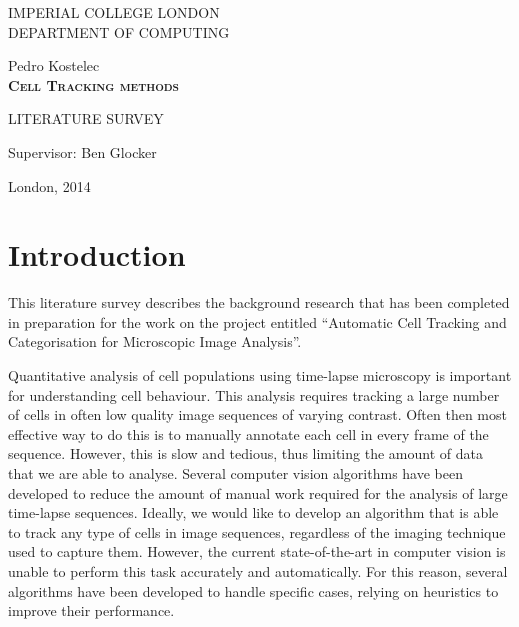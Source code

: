 \documentclass[12pt,a4paper,openany]{book}
\begin{document}
\thispagestyle{empty} 

\begin{center}
{\large 
IMPERIAL COLLEGE LONDON \\
DEPARTMENT OF COMPUTING\\
}

\vspace{3cm}
{\LARGE Pedro Kostelec}\\

\vspace{2cm}
\textsc{\textbf{\LARGE 
Cell Tracking methods 
}}

\vspace{2cm}
{ LITERATURE SURVEY }

\vspace{2cm} 
{\Large Supervisor: Ben Glocker}

\vfill
{\Large London, 2014}
\end{center}



\thispagestyle{empty}

\newpage




\renewcommand\thepage{} 
\tableofcontents 
\renewcommand\thepage{\arabic{page}}

\thispagestyle{empty}

\chapter{Introduction}
This literature survey describes the background research that has been completed in preparation for the work on the project entitled ``Automatic Cell Tracking and Categorisation for Microscopic Image Analysis''.

Quantitative analysis of cell populations using time-lapse microscopy is important for understanding cell behaviour. This analysis requires tracking a large number of cells in often low quality image sequences of varying contrast. Often then most effective way to do this is to manually annotate each cell in every frame of the sequence. However, this is slow and tedious, thus limiting the amount of data that we are able to analyse. Several computer vision algorithms have been developed to reduce the amount of manual work required for the analysis of large time-lapse sequences. Ideally, we would like to develop an algorithm that is able to track any type of cells in image sequences, regardless of the imaging technique used to capture them. However, the current state-of-the-art in computer vision is unable to perform this task accurately and automatically. For this reason, several algorithms have been developed to handle specific cases, relying on heuristics to improve their performance.
\end{document}
